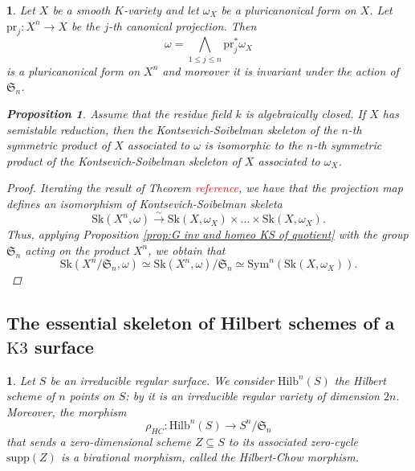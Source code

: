 \documentclass{amsart}%
\numberwithin{equation}{subsection}
\theoremstyle{plain2}
\newtheorem{prop}[equation]{Proposition}
\theoremstyle{definition2}
\theoremstyle{stepstyle}
\theoremstyle{point}
\theoremstyle{subpoint}
\newtheorem{subpoint}[equation]{}%
\newcommand{\spa}[1]{\begin{subpoint}#1\end{subpoint}}           %
\newcommand{\Hilb}{\ensuremath{\mathrm{Hilb}}}
\newcommand{\pr}{\mathrm{pr}}
\newcommand{\Sk}{\mathrm{Sk}}
\begin{document}
\spa{Let $X$ be a smooth $K$-variety and let $\omega_X$ be a pluricanonical form on $X$. Let $\pr_j:X^n \rightarrow X$ be the $j$-th canonical projection. Then $$\omega= \bigwedge_{1\leqslant j \leqslant n} \pr_j^*\omega_X$$ is a pluricanonical form on $X^n$ and moreover it is invariant under the action of $\mathfrak{S}_n$.
\begin{prop}  \label{prop semistability and KS symm quotient}
Assume that the residue field $k$ is algebraically closed.  If $X$ has semistable reduction, then the Kontsevich-Soibelman skeleton of the $n$-th symmetric product of $X$ associated to $\omega$ is isomorphic to the $n$-th symmetric product of the Kontsevich-Soibelman skeleton of $X$ associated to $\omega_X$.
\end{prop}
\begin{proof}
Iterating the result of Theorem \textcolor{red}{reference}, we have that the projection map defines an isomorphism of Kontsevich-Soibelman skeleta $$\Sk(X^n, \omega) \xrightarrow{\sim} \Sk(X,\omega_X) \times  \ldots \times \Sk(X,\omega_X).$$ Thus, applying Proposition \ref{prop:G inv and homeo KS of quotient} with the group $\mathfrak{S}_n$ acting on the product $X^n$, we obtain that $$\Sk(X^n/\mathfrak{S}_n, \omega) \simeq \Sk(X^n,\omega)/\mathfrak{S}_n \simeq  \text{Sym}^n(\Sk(X,\omega_X)).$$
\end{proof}
}

\subsection{The essential skeleton of Hilbert schemes of a $\text{K3}$ surface} \label{sect essential sk Hilb}

\spa{Let $S$ be an irreducible regular surface. We consider $\Hilb^n(S)$ the Hilbert scheme of $n$ points on $S$: by \cite{Fogarty} it is an irreducible regular variety of dimension $2n$. Moreover, the morphism $$\rho_{HC}: \Hilb^n(S) \rightarrow S^n/\mathfrak{S}_n$$ that sends a zero-dimensional scheme $Z \subseteq S$ to its associated zero-cycle $\text{supp}(Z)$ is a birational morphism, called the Hilbert-Chow morphism.}
\end{document}
